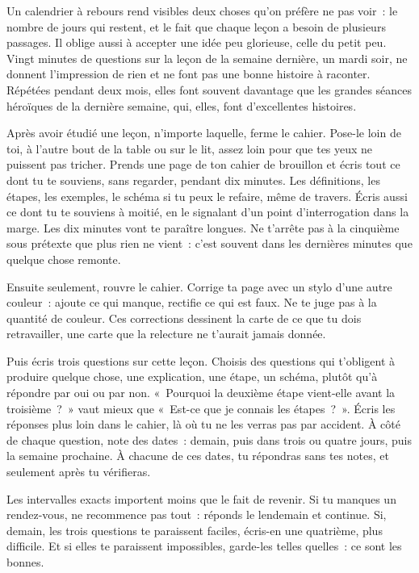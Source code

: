 \documentclass[10.5pt,twoside,openright]{book}
\newcommand{\soustitre}[1]{\par\vspace{1.1em}\noindent{\bfseries\color{accent}#1}\par\vspace{0.4em}\noindent}
\begin{document}
Un calendrier à rebours rend visibles deux choses qu’on préfère ne pas voir : le nombre de jours qui restent, et le fait que chaque leçon a besoin de plusieurs passages. Il oblige aussi à accepter une idée peu glorieuse, celle du petit peu. Vingt minutes de questions sur la leçon de la semaine dernière, un mardi soir, ne donnent l’impression de rien et ne font pas une bonne histoire à raconter. Répétées pendant deux mois, elles font souvent davantage que les grandes séances héroïques de la dernière semaine, qui, elles, font d’excellentes histoires.

\soustitre{Ce soir, essaie ceci}

Après avoir étudié une leçon, n’importe laquelle, ferme le cahier. Pose-le loin de toi, à l’autre bout de la table ou sur le lit, assez loin pour que tes yeux ne puissent pas tricher. Prends une page de ton cahier de brouillon et écris tout ce dont tu te souviens, sans regarder, pendant dix minutes. Les définitions, les étapes, les exemples, le schéma si tu peux le refaire, même de travers. Écris aussi ce dont tu te souviens à moitié, en le signalant d’un point d’interrogation dans la marge. Les dix minutes vont te paraître longues. Ne t’arrête pas à la cinquième sous prétexte que plus rien ne vient : c’est souvent dans les dernières minutes que quelque chose remonte.

Ensuite seulement, rouvre le cahier. Corrige ta page avec un stylo d’une autre couleur : ajoute ce qui manque, rectifie ce qui est faux. Ne te juge pas à la quantité de couleur. Ces corrections dessinent la carte de ce que tu dois retravailler, une carte que la relecture ne t’aurait jamais donnée.

Puis écris trois questions sur cette leçon. Choisis des questions qui t’obligent à produire quelque chose, une explication, une étape, un schéma, plutôt qu’à répondre par oui ou par non. « Pourquoi la deuxième étape vient-elle avant la troisième ? » vaut mieux que « Est-ce que je connais les étapes ? ». Écris les réponses plus loin dans le cahier, là où tu ne les verras pas par accident. À côté de chaque question, note des dates : demain, puis dans trois ou quatre jours, puis la semaine prochaine. À chacune de ces dates, tu répondras sans tes notes, et seulement après tu vérifieras.

Les intervalles exacts importent moins que le fait de revenir. Si tu manques un rendez-vous, ne recommence pas tout : réponds le lendemain et continue. Si, demain, les trois questions te paraissent faciles, écris-en une quatrième, plus difficile. Et si elles te paraissent impossibles, garde-les telles quelles : ce sont les bonnes.
\end{document}

